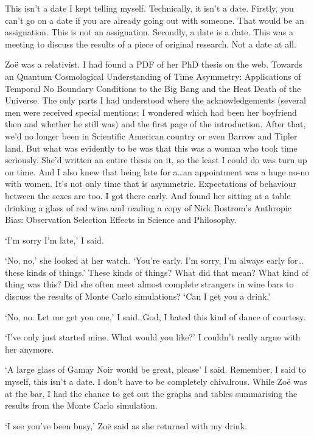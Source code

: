 This isn't a date I kept telling myself. Technically, it isn't a
date. Firstly, you can't go on a date if you are already going out
with someone. That would be an assignation. This is not an assignation.
Secondly, a date is a date. This was a meeting to discuss the
results of a piece of original research. Not a date at all.

Zoë was a relativist. I had found a PDF of her PhD thesis on the
web. {\twelvesl Towards an Quantum Cosmological Understanding of Time
Asymmetry: Applications of Temporal No Boundary Conditions to the Big Bang and the Heat Death of the Universe\/}. The only parts I had understood where the
acknowledgements (several men were received special mentions: I
wondered which had been her boyfriend then and whether he still was)
and the first page of the introduction. After that, we'd no longer
been in {\twelvesl Scientific American\/} country or even Barrow and
Tipler land. But what was evidently to be was that this was a woman
who took time seriously. She'd written an entire thesis on it, so
the least I could do was turn up on time. And I also knew that being
late for a\dots an appointment was a huge no-no with women. It's not
only time that is asymmetric. Expectations of behaviour between the
sexes are too. I got there early. And found her sitting at a table
drinking a glass of red wine and reading a copy of Nick Bostrom's
{\twelvesl Anthropic Bias: Observation Selection Effects in Science
and Philosophy\/}.

`I'm sorry I'm late,' I said.

`No, no,' she looked at her watch. `You're early. I'm sorry, I'm
always early for\dots these kinds of things.' These kinds of things?
What did that mean? What kind of thing was this? Did she often meet
almost complete strangers in wine bars to discuss the results of
Monte Carlo simulations? `Can I get you a drink.'

`No, no. Let me get you one,' I said. God, I hated this kind of
dance of courtesy.

`I've only just started mine. What would you like?' I couldn't
really argue with her anymore.

`A large glass of Gamay Noir would be great, please' I said.
Remember, I said to myself, this isn't a date. I don't have to be
completely chivalrous. While Zoë was at the bar, I had the
chance to get out the graphs and tables summarising the results from
the Monte Carlo simulation.

`I see you've been busy,' Zoë said as she returned with my
drink.

